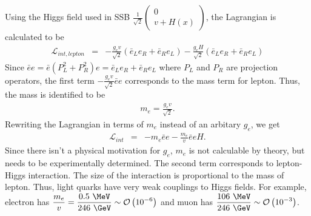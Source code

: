 Using the Higgs field used in SSB 
$\frac{1}{\sqrt{2}} \left(  \begin{array}{c} 0 \\ v + H(x) \end{array} \right)$, 
the Lagrangian is calculated to be 
\begin{eqnarray} 
\mathcal{L}_{int, lepton} 
&=& 
-\frac{g_e v}{\sqrt{2}}\left( \bar{e}_L e_R + \bar{e}_R e_L \right)  
-\frac{g_e H}{\sqrt{2}}\left( \bar{e}_L e_R + \bar{e}_R e_L \right)  
\end{eqnarray} 
Since $\bar{e}e = \bar{e}(P_L^2+P_R^2)e = \bar{e}_L e_R + \bar{e}_R e_L$ where
$P_L$ and $P_R$ are projection operators, the first term 
$\displaystyle -\frac{g_e v}{\sqrt{2}} \bar{e}e$ corresponds to the mass term for lepton. 
Thus, the mass is identified to be 
\begin{eqnarray} 
m_e = \frac{g_e v}{\sqrt{2}}.
\end{eqnarray} 
Rewriting the Lagrangian in terms of $m_e$ instead of an arbitary $g_e$, we get 
\begin{eqnarray} 
\mathcal{L}_{int} 
&=& 
- m_e \bar{e}e  -\frac{m_e}{v} \bar{e}e H. 
\end{eqnarray} 
Since there isn't a physical motivation for $g_e$, $m_e$ is not calculable 
by theory, but needs to be experimentally determined. The second term 
corresponds to lepton-Higgs interaction. The size of the interaction 
is proportional to the mass of lepton. Thus, light quarks have very 
weak couplings to Higgs fields. For example, electron has 
$\displaystyle \frac{m_e}{v} = \frac{0.5~\MeV}{246~\GeV} \sim \mathcal{O}\left(10^{-6}\right)$
and muon has $\displaystyle \frac{106~\MeV}{246~\GeV} \sim \mathcal{O}\left(10^{-3}\right)$.

